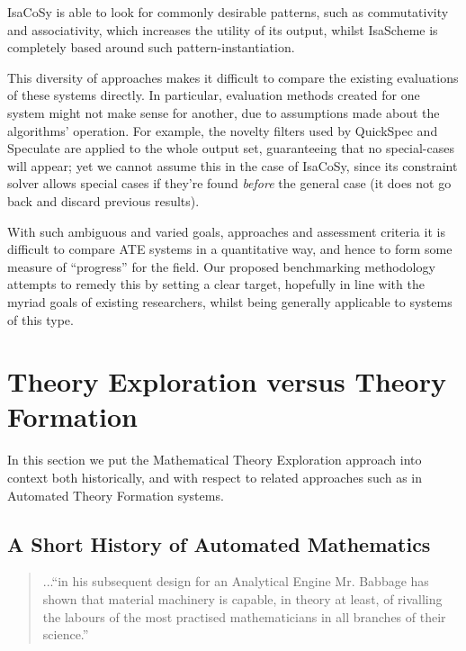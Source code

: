 IsaCoSy is able to look for commonly desirable patterns, such as commutativity
and associativity, which increases the utility of its output, whilst IsaScheme
is completely based around such pattern-instantiation.

This diversity of approaches makes it difficult to compare the existing
evaluations of these systems directly. In particular, evaluation methods created
for one system might not make sense for another, due to assumptions made about
the algorithms' operation. For example, the novelty filters used by QuickSpec
and Speculate are applied to the whole output set, guaranteeing that no
special-cases will appear; yet we cannot assume this in the case of IsaCoSy,
since its constraint solver allows special cases if they're found \emph{before}
the general case (it does not go back and discard previous results).

With such ambiguous and varied goals, approaches and assessment criteria it is
difficult to compare ATE systems in a quantitative way, and hence to form some
measure of ``progress'' for the field. Our proposed benchmarking methodology
attempts to remedy this by setting a clear target, hopefully in line with the
myriad goals of existing researchers, whilst being generally applicable to
systems of this type.

\section{Theory Exploration versus Theory
  Formation}\label{exploration-versus-formation}

In this section we put the Mathematical Theory Exploration approach
into context both historically, and with respect to related approaches
such as in Automated Theory Formation systems.

\subsection{A Short History of Automated Mathematics}

\begin{quote}
...``in his subsequent design for an Analytical Engine Mr. Babbage has
shown that material machinery is capable, in theory at least, of
rivalling the labours of the most practised mathematicians in all
branches of their science.'' \cite[p. 498]{jevons}
\end{quote}

